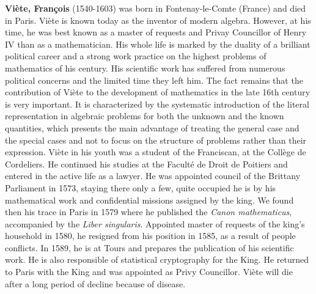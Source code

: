 \textbf{Viète, François} (1540-1603) was born in Fontenay-le-Comte (France) and died in Paris. Viète is known today as the inventor of modern algebra. However, at his time, he was best known as a master of requests and Privay Councillor of Henry IV than as a mathematician. His whole life is marked by the duality of a brilliant political career and a strong work practice on the highest problems of mathematics of his century. His scientific work has suffered from numerous political concerns and the limited time they left him. The fact remains that the contribution of Viète to the development of mathematics in the late 16th century is very important. It is characterized by the systematic introduction of the literal representation in algebraic problems for both the unknown and the known quantities, which presents the main advantage of treating the general case and the special cases and not to focus on the structure of problems rather than their expression. Viète in his youth was a student of the Franciscan, at the Collège de Cordeliers. He continued his studies at the Faculté de Droit de Poitiers and entered in the active life as a lawyer. He was appointed council of the Brittany Parliament in 1573, staying there only a few, quite occupied he is by his mathematical work and confidential missions assigned by the king. We found then his trace in Paris in 1579 where he published the \textit{Canon mathematicus}, accompanied by the \textit{Liber singularis}. Appointed master of requests of the king's household in 1580, he resigned from his position in 1585, as a result of people conflicts. In 1589, he is at Tours and prepares the publication of his scientific work. He is also responsible of statistical cryptography for the King. He returned to Paris with the King and was appointed as Privy Councillor. Viète will die after a long period of decline because of disease.

{}


